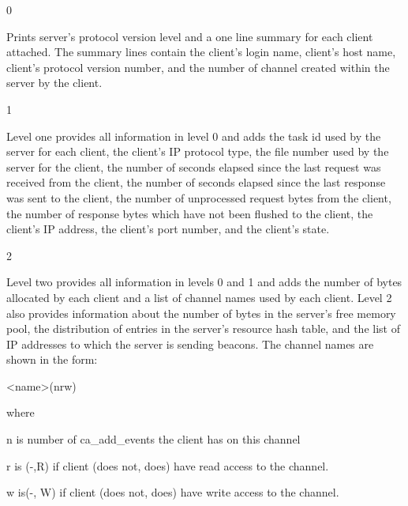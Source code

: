 \begin{description}

\item 0 

Prints server's protocol version level and a one line summary for each client attached. The summary lines 
contain the client's login name, client's host name, client's protocol version number, and the number of 
channel created within the server by the client.

\item 1

Level one provides all information in level 0 and adds the task id used by the server for each client, the 
client's IP protocol type, the file number used by the server for the client, the number of seconds elapsed 
since the last request was received from the client, the number of seconds elapsed since the last response 
was sent to the client, the number of unprocessed request bytes from the client, the number of response bytes 
which have not been flushed to the client, the client's IP address, the client's port number, and the client's 
state.

\item 2

Level two provides all information in levels 0 and 1 and adds the number of bytes allocated by each client 
and a list of channel names used by each client. Level 2 also provides information about the number of bytes 
in the server's free memory pool, the distribution of entries in the server's resource hash table, and the list of 
IP addresses to which the server is sending beacons. The channel names are shown in the form:

\textless{}name\textgreater{}(nrw)

where

\begin{description}

\item n is number of ca\_add\_events the client has on this channel

\item r is (-,R) if client (does not, does) have read access to the channel.

\item w is(-, W) if client (does not, does) have write access to the channel.

\end{description}

\end{description}

